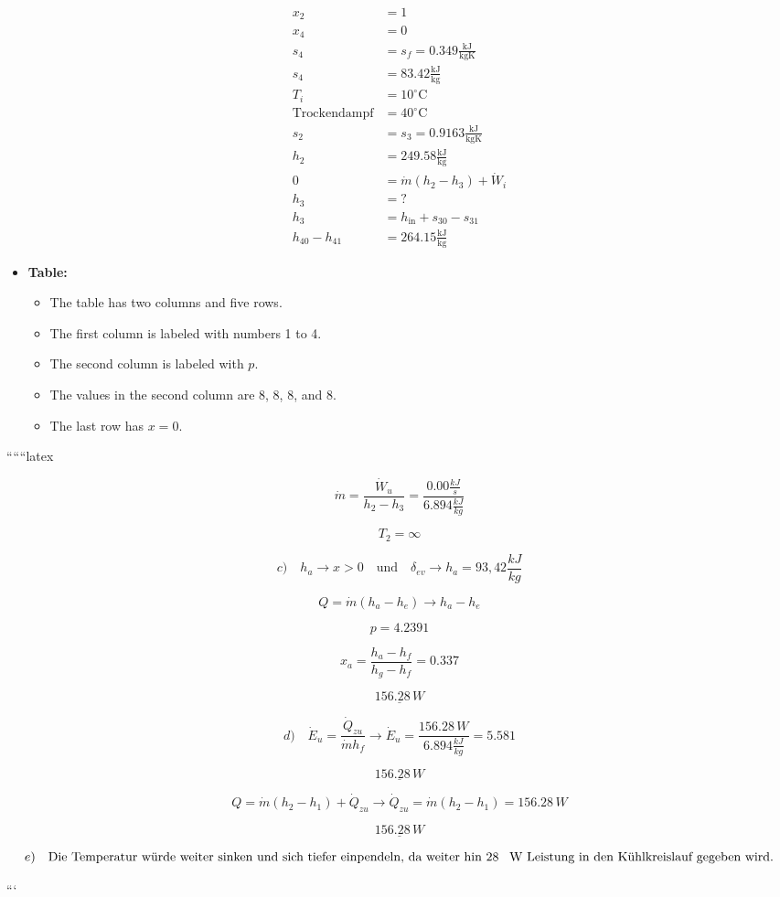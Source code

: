 \begin{align*}
    x_2 &= 1 \\
    x_4 &= 0 \\
    s_4 &= s_f = 0.349 \frac{\text{kJ}}{\text{kgK}} \\
    s_4 &= 83.42 \frac{\text{kJ}}{\text{kg}} \\
    T_i &= 10^\circ \text{C} \\
    \text{Trockendampf} &= 40^\circ \text{C} \\
    s_2 &= s_3 = 0.9163 \frac{\text{kJ}}{\text{kgK}} \\
    h_2 &= 249.58 \frac{\text{kJ}}{\text{kg}} \\
    0 &= \dot{m} (h_2 - h_3) + \dot{W}_i \\
    h_3 &= ? \\
    h_3 &= h_{\text{in}} + s_{30} - s_{31} \\
    h_{40} - h_{41} &= 264.15 \frac{\text{kJ}}{\text{kg}}
\end{align*}

\begin{itemize}
    \item \textbf{Table:}
    \begin{itemize}
        \item The table has two columns and five rows.
        \item The first column is labeled with numbers 1 to 4.
        \item The second column is labeled with \( p \).
        \item The values in the second column are 8, 8, 8, and 8.
        \item The last row has \( x = 0 \).
    \end{itemize}
\end{itemize}

``````latex


\[
\dot{m} = \frac{\dot{W}_u}{h_2 - h_3} = \frac{0.00 \frac{kJ}{s}}{6.894 \frac{kJ}{kg}}
\]

\[
T_2 = \infty
\]

\[
c) \quad h_{a} \rightarrow x > 0 \quad \text{und} \quad \delta_{ev} \rightarrow h_{a} = 93,42 \frac{kJ}{kg}
\]

\[
Q = \dot{m} (h_a - h_e) \rightarrow h_a - h_e
\]

\[
p = 4.2391
\]

\[
x_a = \frac{h_a - h_f}{h_g - h_f} = 0.337
\]

\[
\underline{156.28 \, W}
\]

\[
d) \quad \dot{E}_u = \frac{\dot{Q}_{zu}}{\dot{m} h_f} \rightarrow \dot{E}_u = \frac{156.28 \, W}{6.894 \frac{kJ}{kg}} = 5.581
\]

\[
\underline{156.28 \, W}
\]

\[
Q = \dot{m} (h_2 - h_1) + \dot{Q}_{zu} \rightarrow \dot{Q}_{zu} = \dot{m} (h_2 - h_1) = 156.28 \, W
\]

\[
\underline{156.28 \, W}
\]

\[
e) \quad \text{Die Temperatur würde weiter sinken und sich tiefer einpendeln, da weiter hin 28 \, W Leistung in den Kühlkreislauf gegeben wird.}
\]

```